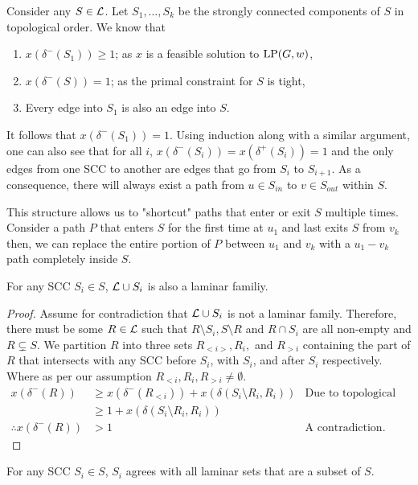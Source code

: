 
	Consider any $S\in \mathcal{L}$. Let $S_1,\dots, S_k$ be the strongly connected components of $S$ in topological order.
	We know that
	\begin{enumerate}
		\item $x(\delta^-(S_1)) \geq 1$; as $x$ is a feasible solution to $\textup{LP}(G,w)$,
		\item $x(\delta^-(S)) = 1$; as the primal constraint for $S$ is tight,
		\item Every edge into $S_1$ is also an edge into $S$.
	\end{enumerate}
	It follows that $x(\delta^-(S_1)) = 1$.
	Using induction along with a similar argument, one can also see that for all $i$, $x(\delta^-(S_i)) = x(\delta^+(S_i)) = 1$ and the only edges from one SCC to another are edges that go from $S_i$ to $S_{i + 1}$.
	As a consequence, there will always exist a path from $u\in S_{in}$ to $v\in S_{out}$ within $S$.

	This structure allows us to "shortcut" paths that enter or exit $S$ multiple times. Consider a path $P$ that enters $S$ for the first time at $u_1$ and last exits $S$ from $v_k$ then, we can replace the entire portion of $P$ between $u_1$ and $v_k$ with a $u_1 - v_k$ path completely inside $S$.\\
	
	\begin{lemma}\label{lemm:2:SiAgree}
		For any SCC $S_i \in S$, $\mathcal{L} \cup S_i$ is also a laminar familiy.
	\end{lemma}
	\begin{proof}
		Assume for contradiction that $\mathcal{L} \cup S_i$ is not a laminar family. 
		Therefore, there must be some $R \in \mathcal{L}$ such that $R\setminus S_i, S\setminus R$ and $R \cap S_i$ are all non-empty and $R \subsetneq S$.
		We partition $R$ into three sets $R_{<i>}, R_i,$ and $R_{>i}$ containing the part of $R$ that intersects with any SCC before $S_i$, with $S_i$, and after $S_i$ respectively. Where as per our assumption $R_{<i}, R_i, R_{>i} \ne \emptyset$.
		\begin{align*}
			x(\delta^-(R)) &\geqslant x(\delta^-(R_{<i})) + x(\delta(S_i\setminus R_i, R_i)) & \text{Due to topological order.}\\
			&\geqslant 1 + x(\delta(S_i\setminus R_i, R_i))\\
			\therefore x(\delta^-(R)) &>1 & \text{A contradiction.}
		\end{align*}
	\end{proof}
	\begin{corollary}
		For any SCC $S_i \in S$, $S_i$ agrees with all laminar sets that are a subset of $S$.\\
	\end{corollary}
	
